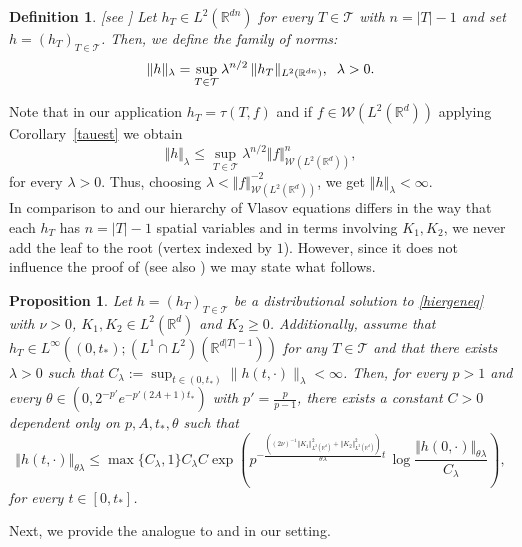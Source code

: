 \documentclass[10pt]{article}
\newtheorem{defi}{Definition}
\newtheorem{prop}{Proposition}
\newcommand{\hd}{\hspace{0.2cm}}
\newcommand*{\norm}[1]{\left\Vert{#1}\right\Vert}
\newcommand{\R}{\mathbb{R}}
\newcommand{\Tree}{\mathcal{T}}
\newcommand{\W}{\mathcal{W}}
\begin{document}
\begin{defi}\label{defnorml}[see \cite[Definition 4.18]{JPS2025}]
Let $h_T\in L^2(\R^{d n})$ for every $T\in \Tree$ with $n=|T|-1$ and  set $h=(h_T)_{T\in \Tree}$. Then,  we define the family of norms:
\[
 \|h\|_{\lambda}=\sup_{T\in \Tree} \lambda^{n/2}\,\|h_T\|_{L^2(\R^{dn})}, \hd \lambda>0.
\]
\end{defi}
%
%
Note that in our application $h_T=\tau(T,f)$ and if $f\in \W(L^2(\R^d))$ applying Corollary~\ref{tauest} we obtain
\[
\Vert h\Vert_\lambda\leq \sup_{T\in \Tree} \lambda^{n/2}\Vert f\Vert_{\W(L^2(\R^d))}^{n},
\]
for every $\lambda>0$. Thus,  choosing $\lambda  < \Vert f\Vert_{\W(L^2(\R^d))}^{-2}$, we get $\norm{h}_{\lambda} < \infty$. \\
%
In comparison to \cite{JPS2025} and \cite{nasza} our hierarchy of Vlasov  equations differs in the way that each $h_T$ has $n=|T|-1$ spatial variables and in terms involving $K_1,K_2$, we never add the leaf to the root (vertex indexed by $1$). However, since it does not influence the proof of \cite[Lemma 8]{nasza} (see also \cite[Theorem 4.19]{JPS2025}) we may state what follows.
\begin{prop} \label{hlambdabound}\cite[Lemma 8]{nasza}
Let $h=(h_T)_{T\in \Tree}$ be a distributional solution to \eqref{hiergeneq} with  $\nu>0$, $K_1, K_2\in L^2(\R^d)$ and $K_2 \geq 0$. Additionally, assume that $h_T\in L^\infty((0,t_{*});(L^1\cap L^2)(\R^{d |T|-1}))$ for any $T\in \Tree$ and that there exists $\lambda>0$ such that $C_\lambda:=\sup_{t\in (0, t_*)}\|h(t,\cdot)\|_{\lambda}<\infty$. Then, for every $p>1$ and every $\theta\in (0,2^{-p'}e^{-p'(2A+1)t_*})$ with $p'=\frac{p}{p-1}$, there exists a constant $C > 0$ dependent only on $p,A,t_*,\theta$ such that 
\[
\Vert h(t,\cdot)\Vert_{\theta\lambda}\leq \max\{C_{\lambda},1\}C_\lambda C\exp\left(p^{-\frac{\left((2\nu)^{-1}\norm{K_1}_{L^{2}(\R^d)}^2  + \norm{K_2}_{L^{2}(\R^d)}^2\right)}{\theta\lambda}t}\,\log\frac{\Vert h(0,\cdot)\Vert_{\theta \lambda}}{C_\lambda}\right),
\]
for every $t\in [0, t_*]$.
\end{prop}

Next, we provide the analogue to \cite[Lemma 9]{nasza} and \cite[Lemma 4.22]{JPS2025} in our setting.
\end{document}
